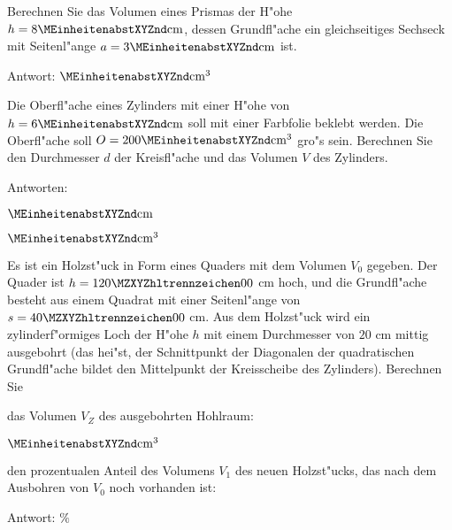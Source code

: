 \begin{MExercises}

\begin{MExercise}
Berechnen Sie das Volumen eines Prismas der H"ohe $h = 8 \MEinheit{cm}$, dessen 
Grundfl"ache ein gleichseitiges Sechseck mit Seitenl"ange $a = 3 \MEinheit{cm}$ 
ist.
\par
Antwort:  $\MEinheit{cm}^3$
\end{MExercise}

\begin{MExercise}
Die Oberfl"ache eines Zylinders mit einer H"ohe von $h = 6 \MEinheit{cm}$ 
soll mit einer Farbfolie beklebt werden. Die Oberfl"ache soll 
$O = 200 \MEinheit{cm}^3$ gro"s sein. Berechnen Sie den Durchmesser $d$ der 
Kreisfl"ache und das Volumen $V$ des Zylinders.

Antworten:
\begin{MExerciseItems}
\item %
  $\MEinheit{cm}$
\item %
  $\MEinheit{cm}^3$
\end{MExerciseItems}
\end{MExercise}

\begin{MExercise}
Es ist ein Holzst"uck in Form eines Quaders mit dem Volumen $V_0$ gegeben. 
Der Quader ist $h = \MZahl{120}{00}$ cm hoch, und die Grundfl"ache besteht aus 
einem Quadrat mit einer Seitenl"ange von $s = \MZahl{40}{00}$ cm.
Aus dem Holzst"uck wird ein zylinderf"ormiges Loch der H"ohe $h$ mit einem 
Durchmesser von $20$ cm {\glqq}mittig{\grqq} ausgebohrt (das hei"st, der 
Schnittpunkt der Diagonalen der quadratischen Grundfl"ache bildet den 
Mittelpunkt der Kreisscheibe des Zylinders).
Berechnen Sie
\begin{MExerciseItems}
\item das Volumen $V_Z$ des ausgebohrten Hohlraum:
\par
{} $\MEinheit{cm^3}$
%
\item den prozentualen Anteil des Volumens $V_1$ des neuen Holzst"ucks, 
das nach dem Ausbohren von $V_0$ noch vorhanden ist:
\par
Antwort:  $\%$
\end{MExerciseItems}
\end{MExercise}
\end{MExercises}



